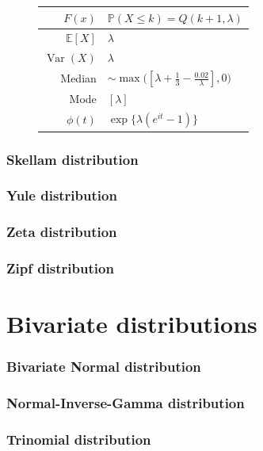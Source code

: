 \documentclass[a4paper,11pt]{article}
\theoremstyle{plain}
\theoremstyle{definition}
\newcommand{\ME}{\mathbb{E}}
\newcommand{\MP}{\mathbb{P}}
\newcommand{\Var}{\operatorname{Var}}
\begin{document}
\begin{figure}[!htb]
\begin{minipage}{0.4\textwidth}
\begin{tabular}{| r | l |}
					\hline
					$F(x)$ & $\MP(X \leq k)=Q(k+1, \lambda)$ \\
					\hline
					$\ME[X]$ & $ \lambda$ \\
					\hline
					$\Var(X)$ & $\lambda$ \\
					\hline
					Median & $\sim \max\big([\lambda + \frac{1}{3} - \frac{0.02}{\lambda}], 0\big) $ \\
					\hline
					Mode & $[\lambda]$ \\
					\hline
					$\phi(t)$ & $ \exp \{ \lambda(e^{it}-1) \}  $ \\
					\hline
				\end{tabular}
			\end{minipage}
		\end{figure}
	
	\pagebreak
	\section{Skellam distribution}
	
	\pagebreak
	\section{Yule distribution}
	
	\pagebreak
	\section{Zeta distribution}
	
	\pagebreak
	\section{Zipf distribution}
	
	\pagebreak
	\part{Bivariate distributions}
	\section{Bivariate Normal distribution}
	\section{Normal-Inverse-Gamma distribution}
	\section{Trinomial distribution}
	
\end{document}
